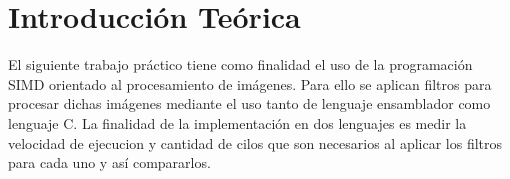 \section{Introducci\'on Te\'orica}

El siguiente trabajo pr\'actico tiene como finalidad el uso de la programaci\'on SIMD orientado al procesamiento de im\'agenes. Para ello se aplican filtros para procesar dichas im\'agenes mediante el uso tanto de lenguaje ensamblador como lenguaje C.\newline
\indent La finalidad de la implementaci\'on en dos lenguajes es medir la velocidad de ejecucion y cantidad de cilos que son necesarios al aplicar los filtros para cada uno y as\'i compararlos.

